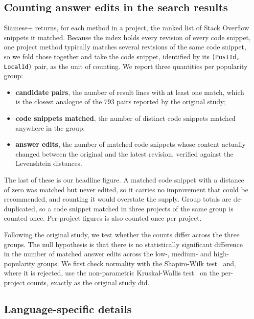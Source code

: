 \documentclass[onecolumn,11pt]{IEEEtran}
\begin{document}
\subsection{Counting answer edits in the search results}
\label{sec:counting}

Siamese+ returns, for each method in a project, the ranked list of Stack Overflow snippets it matched.
Because the index holds every revision of every code snippet, one project method typically matches several revisions of the same code snippet, so we fold those together and take the code snippet, identified by its \texttt{(PostId, LocalId)} pair, as the unit of counting.
We report three quantities per popularity group:

\begin{itemize}
\item \textbf{candidate pairs}, the number of result lines with at least one match, which is the closest analogue of the 793 pairs reported by the original study;
\item \textbf{code snippets matched}, the number of distinct code snippets matched anywhere in the group;
\item \textbf{answer edits}, the number of matched code snippets whose content actually changed between the original and the latest revision, verified against the Levenshtein distances.
\end{itemize}

The last of these is our headline figure.
A matched code snippet with a distance of zero was matched but never edited, so it carries no improvement that could be recommended, and counting it would overstate the supply.
Group totals are de-duplicated, so a code snippet matched in three projects of the same group is counted once. Per-project figures is also counted once per project.

Following the original study, we test whether the counts differ across the three groups.
The null hypothesis is that there is no statistically significant difference in the number of matched answer edits across the low-, medium- and high-popularity groups.
We first check normality with the Shapiro-Wilk test~\cite{shapiro1965normality} and, where it is rejected, use the non-parametric Kruskal-Wallis test~\cite{kruskal1952ranks} on the per-project counts, exactly as the original study did.

\subsection{Language-specific details}
\end{document}
